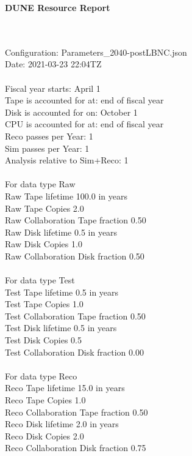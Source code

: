 \documentclass[12pt]{article}
\begin{document}
\parindent=0pt
\setlength{\textwidth=7.0in}
\centerline{\bf{DUNE Resource Report}}\\  \\  Configuration: Parameters\_2040-postLBNC.json\\  Date: 2021-03-23 22:04TZ\\   \\  Fiscal year starts: April 1\\
Tape is accounted for at: end of fiscal year\\
Disk is accounted for on: October 1\\
CPU is accounted for at: end of fiscal year\\
Reco passes per Year: 1\\
Sim passes per Year: 1\\
Analysis relative to Sim+Reco: 1\\
\pagebreak
\\
For data type Raw\\
   Raw Tape lifetime 100.0 in years\\
   Raw Tape Copies   2.0\\
   Raw Collaboration Tape fraction  0.50\\
   Raw Disk lifetime   0.5 in years\\
   Raw Disk Copies   1.0\\
   Raw Collaboration Disk fraction  0.50\\
\\
For data type Test\\
  Test Tape lifetime   0.5 in years\\
  Test Tape Copies   1.0\\
  Test Collaboration Tape fraction  0.50\\
  Test Disk lifetime   0.5 in years\\
  Test Disk Copies   0.5\\
  Test Collaboration Disk fraction  0.00\\
\\
For data type Reco\\
  Reco Tape lifetime  15.0 in years\\
  Reco Tape Copies   1.0\\
  Reco Collaboration Tape fraction  0.50\\
  Reco Disk lifetime   2.0 in years\\
  Reco Disk Copies   2.0\\
  Reco Collaboration Disk fraction  0.75\\
\\
\end{document}

